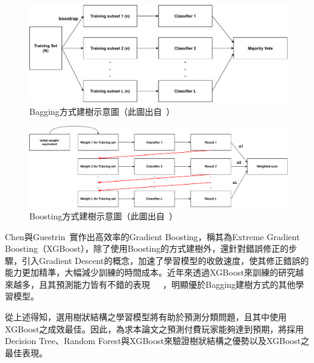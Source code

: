 \begin{figure}[!htb]
    \begin{center}
      \includegraphics[width=1\textwidth]{figures/Image_Bagging.pdf}
      \caption[Bagging方式建樹示意圖]{Bagging方式建樹示意圖（此圖出自~\cite{tommy2018baggingandboosting}）}
      \label{fig:Bagging}
    \end{center}
\end{figure}

\begin{figure}[!htb]
    \begin{center}
      \includegraphics[width=1\textwidth]{figures/Image_Boosting.pdf}
      \caption[Boosting方式建樹示意圖]{Boosting方式建樹示意圖（此圖出自~\cite{tommy2018baggingandboosting}）}
      \label{fig:Boosting}
    \end{center}
\end{figure}

Chen與Guestrin~\cite{chen2016xgboost}實作出高效率的Gradient Boosting，稱其為Extreme Gradient Boosting（XGBoost），除了使用Boosting的方式建樹外，還針對錯誤修正的步驟，引入Gradient Descent的概念，加速了學習模型的收斂速度，使其修正錯誤的能力更加精準，大幅減少訓練的時間成本。近年來透過XGBoost來訓練的研究越來越多，且其預測能力皆有不錯的表現~\cite{martinez2020machine}~\cite{semenov2016performance}~\cite{janusz2017helping}，明顯優於Bagging建樹方式的其他學習模型。

從上述得知，選用樹狀結構之學習模型將有助於預測分類問題，且其中使用XGBoost之成效最佳。因此，為求本論文之預測付費玩家能夠達到預期，將採用Decision Tree、Random Forest與XGBoost來驗證樹狀結構之優勢以及XGBoost之最佳表現。
\newpage

